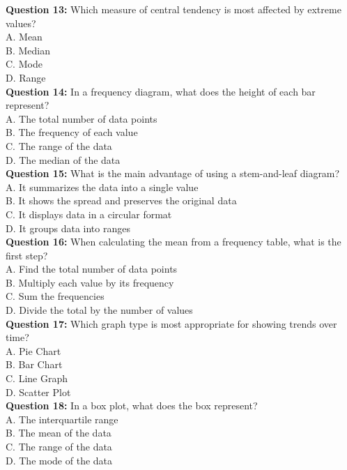 \documentclass{article}
\begin{document}
\textbf{Question 13:} Which measure of central tendency is most affected by extreme values? \\
A. Mean \\
B. Median \\
C. Mode \\
D. Range \\

\textbf{Question 14:} In a frequency diagram, what does the height of each bar represent? \\
A. The total number of data points \\
B. The frequency of each value \\
C. The range of the data \\
D. The median of the data \\

\textbf{Question 15:} What is the main advantage of using a stem-and-leaf diagram? \\
A. It summarizes the data into a single value \\
B. It shows the spread and preserves the original data \\
C. It displays data in a circular format \\
D. It groups data into ranges \\

\textbf{Question 16:} When calculating the mean from a frequency table, what is the first step? \\
A. Find the total number of data points \\
B. Multiply each value by its frequency \\
C. Sum the frequencies \\
D. Divide the total by the number of values \\

\textbf{Question 17:} Which graph type is most appropriate for showing trends over time? \\
A. Pie Chart \\
B. Bar Chart \\
C. Line Graph \\
D. Scatter Plot \\

\textbf{Question 18:} In a box plot, what does the box represent? \\
A. The interquartile range \\
B. The mean of the data \\
C. The range of the data \\
D. The mode of the data \\
\end{document}
